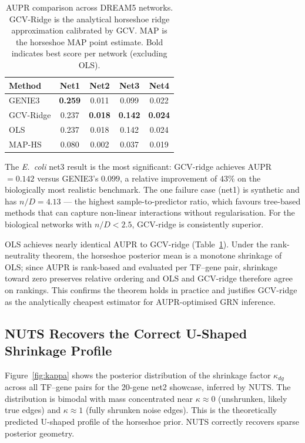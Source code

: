 \documentclass[11pt]{article}
\begin{document}
\begin{table}[h]
\centering
\caption{AUPR comparison across DREAM5 networks. GCV-Ridge is the analytical horseshoe
ridge approximation calibrated by GCV. MAP is the horseshoe MAP point estimate.
Bold indicates best score per network (excluding OLS).}
\label{tab:aupr}
\begin{tabular}{lcccc}
\toprule
Method & Net1 & Net2 & Net3 & Net4 \\
\midrule
GENIE3    & \textbf{0.259} & 0.011 & 0.099 & 0.022 \\
GCV-Ridge & 0.237 & \textbf{0.018} & \textbf{0.142} & \textbf{0.024} \\
OLS       & 0.237 & 0.018 & 0.142 & 0.024 \\
MAP-HS    & 0.080 & 0.002 & 0.037 & 0.019 \\
\bottomrule
\end{tabular}
\end{table}

The \textit{E.~coli} net3 result is the most significant: GCV-ridge achieves AUPR $= 0.142$
versus GENIE3's $0.099$, a relative improvement of $43\%$ on the biologically most
realistic benchmark.
The one failure case (net1) is synthetic and has $n/D = 4.13$ --- the
highest sample-to-predictor ratio, which favours tree-based methods that can capture
non-linear interactions without regularisation.
For the biological networks with $n/D < 2.5$, GCV-ridge is consistently superior.

OLS achieves nearly identical AUPR to GCV-ridge (Table~\ref{tab:aupr}).
Under the rank-neutrality theorem, the horseshoe posterior mean is a monotone shrinkage
of OLS; since AUPR is rank-based and evaluated per TF--gene pair, shrinkage toward zero
preserves relative ordering and OLS and GCV-ridge therefore agree on rankings.
This confirms the theorem holds in practice and justifies GCV-ridge as the analytically
cheapest estimator for AUPR-optimised GRN inference.

\subsection{NUTS Recovers the Correct U-Shaped Shrinkage Profile}

Figure~\ref{fig:kappa} shows the posterior distribution of the shrinkage factor $\kappa_{dg}$
across all TF--gene pairs for the 20-gene net2 showcase, inferred by NUTS.
The distribution is bimodal with mass concentrated near $\kappa \approx 0$ (unshrunken,
likely true edges) and $\kappa \approx 1$ (fully shrunken noise edges). This is the
theoretically predicted U-shaped profile of the horseshoe prior. NUTS correctly recovers
sparse posterior geometry.
\end{document}
